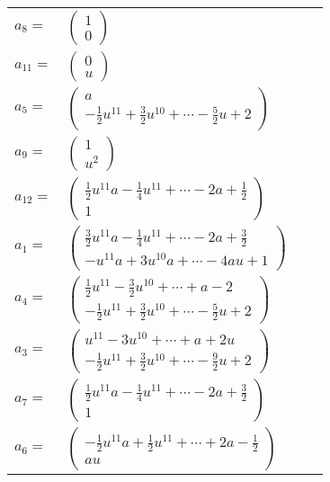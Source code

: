 \documentclass[1p]{elsarticle_modified}
\theoremstyle{definition}
\begin{document}
\begin{tabular}{m{7pt} m{180pt} m{7pt} m{180pt} }
\flushright $a_{8}=$&$\begin{pmatrix}1\\0\end{pmatrix}$ \\
\flushright $a_{11}=$&$\begin{pmatrix}0\\u\end{pmatrix}$ \\
\flushright $a_{5}=$&$\begin{pmatrix}a\\-\frac{1}{2} u^{11}+\frac{3}{2} u^{10}+\cdots-\frac{5}{2} u+2\end{pmatrix}$ \\
\flushright $a_{9}=$&$\begin{pmatrix}1\\u^2\end{pmatrix}$ \\
\flushright $a_{12}=$&$\begin{pmatrix}\frac{1}{2} u^{11} a-\frac{1}{4} u^{11}+\cdots-2 a+\frac{1}{2}\\1\end{pmatrix}$ \\
\flushright $a_{1}=$&$\begin{pmatrix}\frac{3}{2} u^{11} a-\frac{1}{4} u^{11}+\cdots-2 a+\frac{3}{2}\\- u^{11} a+3 u^{10} a+\cdots-4 a u+1\end{pmatrix}$ \\
\flushright $a_{4}=$&$\begin{pmatrix}\frac{1}{2} u^{11}-\frac{3}{2} u^{10}+\cdots+a-2\\-\frac{1}{2} u^{11}+\frac{3}{2} u^{10}+\cdots-\frac{5}{2} u+2\end{pmatrix}$ \\
\flushright $a_{3}=$&$\begin{pmatrix}u^{11}-3 u^{10}+\cdots+a+2 u\\-\frac{1}{2} u^{11}+\frac{3}{2} u^{10}+\cdots-\frac{9}{2} u+2\end{pmatrix}$ \\
\flushright $a_{7}=$&$\begin{pmatrix}\frac{1}{2} u^{11} a-\frac{1}{4} u^{11}+\cdots-2 a+\frac{3}{2}\\1\end{pmatrix}$ \\
\flushright $a_{6}=$&$\begin{pmatrix}-\frac{1}{2} u^{11} a+\frac{1}{2} u^{11}+\cdots+2 a-\frac{1}{2}\\a u\end{pmatrix}$ \\

\end{tabular}
\end{document}
